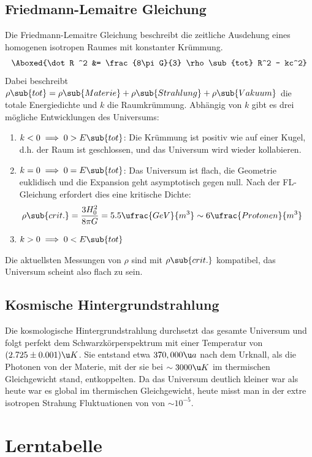 \documentclass[final]{summery_5.0}
\begin{document}
\subsection{Friedmann-Lemaitre Gleichung}
Die Friedmann-Lemaitre Gleichung beschreibt die zeitliche Ausdehung eines homogenen isotropen Raumes mit konstanter Krümmung.
\begin{align*}
    \Aboxed{\dot R ^2 &= \frac{8\pi G}{3} \rho\sub{tot} R^2  - kc^2}
\end{align*}
Dabei beschreibt $\rho\sub{tot}=\rho\sub{Materie}+\rho\sub{Strahlung}+\rho\sub{Vakuum}$ die totale Energiedichte und $k$ die Raumkrümmung. Abhängig von $k$ gibt es drei mögliche Entwicklungen des Universums:
\begin{enumerate}
    \item $k<0\implies 0>E\sub{tot}$: Die Krümmung ist positiv wie auf einer Kugel, d.h. der Raum ist geschlossen, und das Universum wird wieder kollabieren.
    \item $k=0\implies 0=E\sub{tot}$: Das Universum ist flach, die Geometrie euklidisch und die Expansion geht asymptotisch gegen null. Nach der FL-Gleichung erfordert dies eine kritische Dichte:
    \begin{align*}
        \rho\sub{crit.} &= \frac{3H_0^2}{8\pi G} = 5.5 \ufrac{GeV}{m^3} \sim 6\ufrac{Protonen}{m^3}
    \end{align*}
    \item $k>0\implies 0<E\sub{tot}$
\end{enumerate}
Die aktuellsten Messungen von $\rho$ sind mit $\rho\sub{crit.}$ kompatibel, das Universum scheint also flach zu sein. 

\subsection{Kosmische Hintergrundstrahlung}
Die kosmologische Hintergrundstrahlung durchsetzt das gesamte Universum und folgt perfekt dem Schwarzkörperspektrum mit einer Temperatur von $(2.725\pm0.001)\u K$.
Sie entstand etwa $370,000\u a$ nach dem Urknall, als die Photonen von der Materie, mit der sie bei $\sim3000\u K$ im thermischen Gleichgewicht stand, entkoppelten.  
Da das Universum deutlich kleiner war als heute war es global im thermischen Gleichgewicht, heute misst man in der extre isotropen Strahung Fluktuationen von  von $\sim 10^{-5}$.

\section{Lerntabelle}
\end{document}
